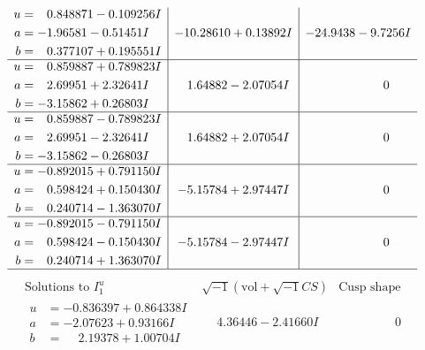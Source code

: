 \documentclass[1p]{elsarticle_modified}
\theoremstyle{definition}
\newcommand{\I}{\sqrt{-1}}
\begin{document}
$$\begin{array}{c|c|c}
\begin{aligned}
u &= \phantom{-}0.848871 - 0.109256 I \\
a &= -1.96581 - 0.51451 I \\
b &= \phantom{-}0.377107 + 0.195551 I\end{aligned}
 & -10.28610 + 0.13892 I & -24.9438 - 9.7256 I \\ \hline\begin{aligned}
u &= \phantom{-}0.859887 + 0.789823 I \\
a &= \phantom{-}2.69951 + 2.32641 I \\
b &= -3.15862 + 0.26803 I\end{aligned}
 & \phantom{-}1.64882 - 2.07054 I & \phantom{-0.000000 } 0 \\ \hline\begin{aligned}
u &= \phantom{-}0.859887 - 0.789823 I \\
a &= \phantom{-}2.69951 - 2.32641 I \\
b &= -3.15862 - 0.26803 I\end{aligned}
 & \phantom{-}1.64882 + 2.07054 I & \phantom{-0.000000 } 0 \\ \hline\begin{aligned}
u &= -0.892015 + 0.791150 I \\
a &= \phantom{-}0.598424 + 0.150430 I \\
b &= \phantom{-}0.240714 - 1.363070 I\end{aligned}
 & -5.15784 + 2.97447 I & \phantom{-0.000000 } 0 \\ \hline\begin{aligned}
u &= -0.892015 - 0.791150 I \\
a &= \phantom{-}0.598424 - 0.150430 I \\
b &= \phantom{-}0.240714 + 1.363070 I\end{aligned}
 & -5.15784 - 2.97447 I & \phantom{-0.000000 } 0\\
 \hline 
 \end{array}$$\newpage$$\begin{array}{c|c|c}  
\text{Solutions to }I^u_{1}& \I (\text{vol} + \sqrt{-1}CS) & \text{Cusp shape}\\
 \hline 
\begin{aligned}
u &= -0.836397 + 0.864338 I \\
a &= -2.07623 + 0.93166 I \\
b &= \phantom{-}2.19378 + 1.00704 I\end{aligned}
 & \phantom{-}4.36446 - 2.41660 I & \phantom{-0.000000 } 0 \\ \hline\begin{aligned}

\end{aligned}
\end{array}$$
\end{document}
